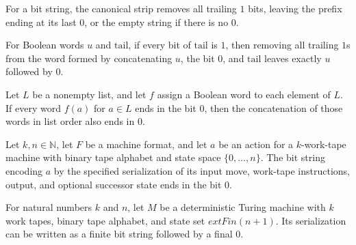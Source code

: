 \begin{definition}
\label{Turing.MachineFormat.canonStrip}
\leanok
For a bit string, the canonical strip removes all trailing $1$ bits, leaving the prefix
ending at its last $0$, or the empty string if there is no $0$.
\end{definition}

\begin{lemma}
\label{Turing.MachineFormat.canonStrip_append}
\leanok
{}
For Boolean words $u$ and $\mathrm{tail}$, if every bit of $\mathrm{tail}$ is $1$, then
removing all trailing $1$s from the word formed by concatenating $u$, the bit $0$, and
$\mathrm{tail}$ leaves exactly $u$ followed by $0$.
\end{lemma}

\begin{lemma}
\label{Turing.MachineFormat.canonFlatMap_last}
\leanok
{}
Let $L$ be a nonempty list, and let $f$ assign a Boolean word to each element of $L$. If
every word $f(a)$ for $a\in L$ ends in the bit $0$, then the concatenation of those
words in list order also ends in $0$.
\end{lemma}

\begin{lemma}
\label{Turing.MachineFormat.actionBitsK_last}
\leanok
{}
Let $k,n\in\mathbb{N}$, let $F$ be a machine format, and let $a$ be an action for a
$k$-work-tape machine with binary tape alphabet and state space $\{0,\ldots,n\}$. The
bit string encoding $a$ by the specified serialization of its input move, work-tape
instructions, output, and optional successor state ends in the bit $0$.
\end{lemma}

\begin{lemma}
\label{Turing.MachineFormat.serializeK_last}
\leanok
{}
For natural numbers $k$ and $n$, let $M$ be a deterministic Turing machine with $k$ work
tapes, binary tape alphabet, and state set $	ext{Fin}(n+1)$. Its serialization can be
written as a finite bit string followed by a final $0$.
\end{lemma}


